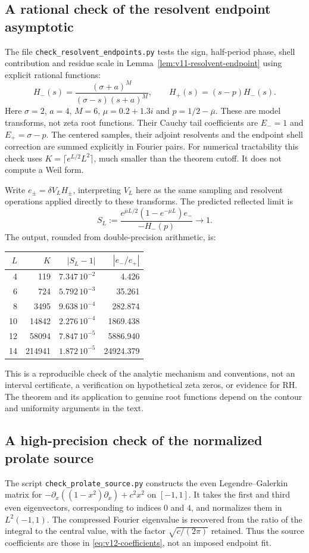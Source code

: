 \documentclass[11pt]{article}
\theoremstyle{remark}
\begin{document}
\subsection*{A rational check of the resolvent endpoint asymptotic}
The file \texttt{check\_resolvent\_endpoints.py} tests the sign, half-period
phase, shell contribution and residue scale in
Lemma~\ref{lem:v11-resolvent-endpoint} using explicit rational functions:
\[
 H_-(s)=\frac{(\sigma+a)^M}{(\sigma-s)(s+a)^M},
 \qquad H_+(s)=(s-p)H_-(s).
\]
Here $\sigma=2$, $a=4$, $M=6$, $\mu=0.2+1.3i$ and
$p=1/2-\overline\mu$. These are model transforms, not zeta root
functions. Their Cauchy tail coefficients are $E_-=1$ and
$E_+=\sigma-p$. The centered samples, their adjoint resolvents and
the endpoint shell correction are summed explicitly in Fourier pairs.
For numerical tractability this check uses
$K=\lceil e^{L/2}L^2\rceil$, much smaller than the theorem cutoff.
It does not compute a Weil form.

Write $e_\pm=\delta V_LH_\pm$, interpreting $V_L$ here as the same
sampling and resolvent operations applied directly to these transforms.
The predicted reflected limit is
\[
 S_L:=\frac{e^{\overline\mu L/2}(1-e^{-\overline\mu L})e_-}
                  {-H_-(p)}\longrightarrow1.
\]
The output, rounded from double-precision arithmetic, is:
\begin{center}
\begin{tabular}{rrrr}
\toprule
$L$ & $K$ & $|S_L-1|$ & $|e_-/e_+|$\\
\midrule
4  & 119    & $7.347\,10^{-2}$ & 4.426\\
6  & 724    & $5.792\,10^{-3}$ & 35.261\\
8  & 3495   & $9.638\,10^{-4}$ & 282.874\\
10 & 14842  & $2.276\,10^{-4}$ & 1869.438\\
12 & 58094  & $7.847\,10^{-5}$ & 5886.940\\
14 & 214941 & $1.872\,10^{-5}$ & 24924.379\\
\bottomrule
\end{tabular}
\end{center}
This is a reproducible check of the analytic mechanism and conventions,
not an interval certificate, a verification on hypothetical zeta zeros,
or evidence for RH. The theorem and its application to genuine root
functions depend on the contour and uniformity arguments in the text.
\subsection*{A high-precision check of the normalized prolate source}
The script \texttt{check\_prolate\_source.py} constructs the even
Legendre--Galerkin matrix for
$-\partial_x((1-x^2)\partial_x)+c^2x^2$ on $[-1,1]$.
It takes the first and third even eigenvectors, corresponding to indices
$0$ and $4$, and normalizes them in $L^2(-1,1)$. The compressed Fourier
eigenvalue is recovered from the ratio of the integral to the central
value, with the factor $\sqrt{c/(2\pi)}$ retained. Thus the source
coefficients are those in \eqref{eq:v12-coefficients}, not an imposed
endpoint fit.
\end{document}
